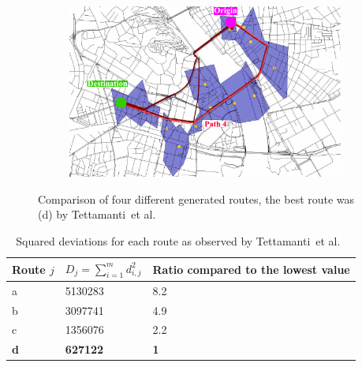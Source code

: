 \documentclass[master,english]{hgbthesis}
\begin{document}
\begin{figure}
\begin{subfigure}[b]{0.5\linewidth}
			\caption{}
			\label{fig:tattipath2}
		\end{subfigure}%
		~
		\begin{subfigure}[b]{0.5\linewidth}
			\includegraphics[width=\textwidth]{./images/tattipath3}
			\caption{}
			\label{fig:tattipath3}
		\end{subfigure}
	\caption{Comparison of four different generated routes, the best route was (d) by Tettamanti~et al.\ \cite{Tettamanti2012}}\label{fig:tettaroutes}
\end{figure}
\begin{table}[ht]
\begin{tabular}{l|ll}
\hline
Route $j$                   &  $D_j=\sum_{i=1}^{m} d_{i,j}^{2}$ & Ratio compared to
the lowest value  \\ \hline
a&5130283&8.2 \\
b&3097741&4.9 \\
c&1356076&2.2 \\
\textbf{d}  &\textbf{627122} &\textbf{1} \\ \hline
\end{tabular}
\caption{Squared deviations for each route as observed by Tettamanti~et al.\ \cite{Tettamanti2012}}
\label{tab:tetta}
\end{table}
\end{document}
